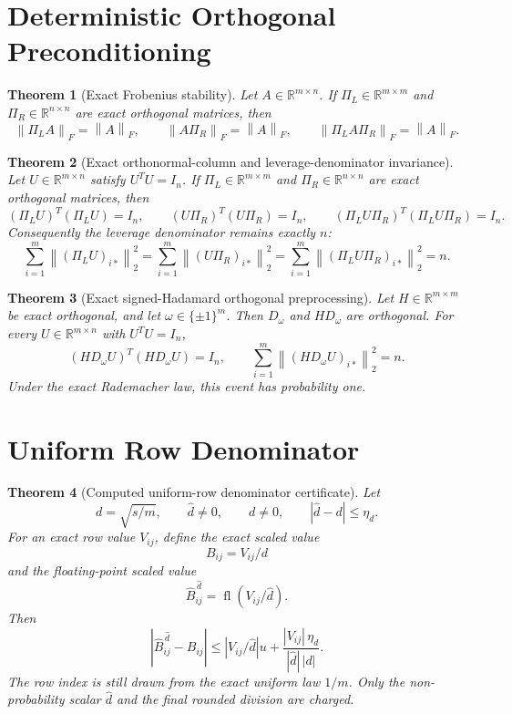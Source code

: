 \documentclass[11pt]{article}
\newcommand{\R}{\mathbb{R}}
\newcommand{\Frob}[1]{\left\lVert #1\right\rVert_F}
\newcommand{\Norm}[1]{\left\lVert #1\right\rVert_2}
\newcommand{\fl}{\operatorname{fl}}
\newcommand{\I}{I}
\newtheorem{theorem}{Theorem}
\theoremstyle{remark}
\begin{document}
\section*{Deterministic Orthogonal Preconditioning}

\begin{theorem}[Exact Frobenius stability]
Let \(A\in\R^{m\times n}\).  If
\(\Pi_L\in\R^{m\times m}\) and \(\Pi_R\in\R^{n\times n}\) are exact
orthogonal matrices, then
\[
  \Frob{\Pi_LA}=\Frob{A},\qquad
  \Frob{A\Pi_R}=\Frob{A},\qquad
  \Frob{\Pi_LA\Pi_R}=\Frob{A}.
\]
\end{theorem}

\begin{theorem}[Exact orthonormal-column and leverage-denominator invariance]
Let \(U\in\R^{m\times n}\) satisfy \(U^TU=\I_n\).  If
\(\Pi_L\in\R^{m\times m}\) and \(\Pi_R\in\R^{n\times n}\) are exact
orthogonal matrices, then
\[
  (\Pi_LU)^T(\Pi_LU)=\I_n,\qquad
  (U\Pi_R)^T(U\Pi_R)=\I_n,\qquad
  (\Pi_LU\Pi_R)^T(\Pi_LU\Pi_R)=\I_n .
\]
Consequently the leverage denominator remains exactly \(n\):
\[
  \sum_{i=1}^m \Norm{(\Pi_LU)_{i*}}^2
  =
  \sum_{i=1}^m \Norm{(U\Pi_R)_{i*}}^2
  =
  \sum_{i=1}^m \Norm{(\Pi_LU\Pi_R)_{i*}}^2
  =
  n .
\]
\end{theorem}

\begin{theorem}[Exact signed-Hadamard orthogonal preprocessing]
Let \(H\in\R^{m\times m}\) be exact orthogonal, and let
\(\omega\in\{\pm1\}^m\).  Then \(D_\omega\) and \(HD_\omega\) are orthogonal.
For every \(U\in\R^{m\times n}\) with \(U^TU=\I_n\),
\[
  (HD_\omega U)^T(HD_\omega U)=\I_n,
  \qquad
  \sum_{i=1}^m \Norm{(HD_\omega U)_{i*}}^2=n .
\]
Under the exact Rademacher law, this event has probability one.
\end{theorem}

\section*{Uniform Row Denominator}

\begin{theorem}[Computed uniform-row denominator certificate]
Let
\[
  d=\sqrt{s/m},\qquad \widehat d\ne0,\qquad d\ne0,
  \qquad |\widehat d-d|\le \eta_d .
\]
For an exact row value \(V_{ij}\), define the exact scaled value
\[
  B_{ij}=V_{ij}/d
\]
and the floating-point scaled value
\[
  \widehat B_{ij}^{\,\widehat d}=\fl(V_{ij}/\widehat d).
\]
Then
\[
  \left|\widehat B_{ij}^{\,\widehat d}-B_{ij}\right|
  \le
  \left|V_{ij}/\widehat d\right|u
  +
  \frac{|V_{ij}|\,\eta_d}{|\widehat d|\,|d|}.
\]
The row index is still drawn from the exact uniform law \(1/m\).  Only the
non-probability scalar \(\widehat d\) and the final rounded division are
charged.
\end{theorem}
\end{document}
